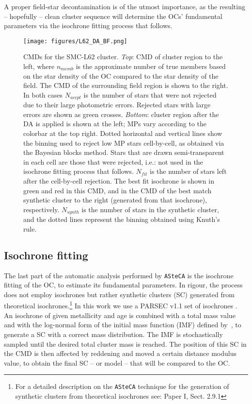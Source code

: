 \documentclass[a4paper,fleqn,usenatbib]{mnras}
\begin{document}
A proper field-star decontamination is of the utmost importance, as the
resulting -- hopefully -- clean cluster sequence will determine the OCs'
fundamental parameters via the isochrone fitting process that follows.

\begin{figure}
\texttt{[image: figures/L62\_DA\_BF.png]}
\caption{CMDs for the SMC-L62 cluster. \emph{Top}: CMD of cluster region to the
left, where $n_{memb}$ is the approximate number of true members based on the
star density of the OC compared to the star density of the field. The CMD of the
surrounding field region is shown to the right. In both cases $N_{accpt}$ is
the number of stars that were not rejected due to their large photometric
errors. Rejected stars with large errors are shown as green crosses.
\emph{Bottom}: cluster region after the DA is applied is shown at the left; MPs
vary according to the colorbar at the top right.
Dotted horizontal and vertical lines show the binning used to reject low MP
stars cell-by-cell, as obtained via the Bayesian blocks
method. Stars that are drawn semi-transparent in each cell are those that were
rejected, i.e.: not used in the isochrone fitting process that follows.
$N_{fit}$ is the number of stars left after the cell-by-cell rejection.
The best fit isochrone is shown in green and red in this CMD, and in the CMD of
the best match synthetic cluster to the right (generated from that isochrone),
respectively. $N_{synth}$ is the number of stars in the synthetic cluster, and
the dotted lines represent the binning obtained using Knuth's rule.}
\label{fig:DA_BF}
\end{figure}




\subsection{Isochrone fitting}
\label{ssec:isoch-fit}

The last part of the automatic analysis performed by \texttt{ASteCA} is the isochrone
fitting of the OC, to estimate its fundamental parameters.
In rigour, the process does not employ isochrones but rather synthetic clusters
(SC) generated from theoretical isochrones.\footnote{For a detailed description
on the \texttt{ASteCA} technique for the generation of synthetic clusters from
theoretical isochrones see: Paper I, Sect. 2.9.1}
%
In this work we use a PARSEC v1.1 set of isochrones \citep[][B12]{Bressan_2012}.
%
An isochrone of given metallicity and age is combined with a total mass value
and with the log-normal form of the initial mass function (IMF) defined
by~\cite{Chabrier_2001}, to generate a SC with a correct mass distribution.
The IMF is stochastically sampled until the desired total cluster
mass is reached.
%
The position of this SC in the CMD is then affected by reddening and moved a
certain distance modulus value, to obtain the final SC -- or model -- that will
be compared to the OC.\@
\end{document}

